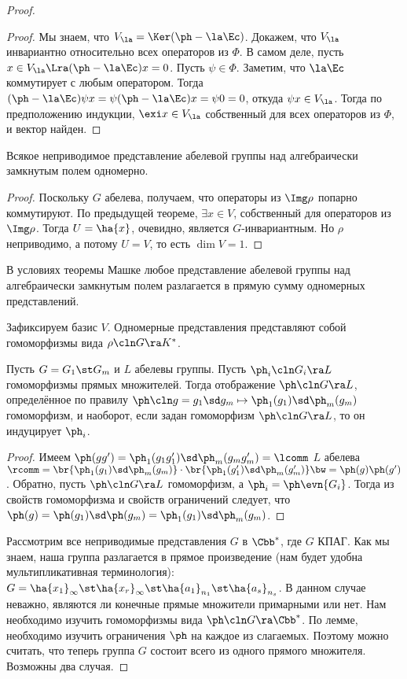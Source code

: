 \documentclass[a4paper]{article}
\begin{document}
\begin{proof}
\begin{proof}
Мы знаем, что $V_\la = \Ker(\ph - \la \Ec)$. Докажем, что $V_\la$ инвариантно  относительно всех операторов
из $\Phi$. В самом деле, пусть $x \in V_\la \Lra (\ph - \la \Ec)x = 0$. Пусть $\psi \in \Phi$. Заметим, что
$\la \Ec$ коммутирует с любым оператором. Тогда $(\ph - \la \Ec)\psi x = \psi (\ph - \la \Ec) x = \psi 0 =
0$, откуда $\psi x \in V_\la$. Тогда по предположению индукции, $\exi x \in V_\la$ собственный для всех
операторов из $\Phi$, и вектор найден.
\end{proof}

\begin{theorem}
Всякое неприводимое представление абелевой группы над алгебраически замкнутым полем одномерно.
\end{theorem}
\begin{proof}
Поскольку $G$ абелева, получаем, что операторы из $\Img \rho$ попарно  коммутируют. По предыдущей теореме,
$\exi x \in V$, собственный для операторов из $\Img \rho$. Тогда $U = \ha{x}$, очевидно, является
$G$-инвариантным. Но $\rho$ неприводимо, а потому $U = V$, то есть $\dim V = 1$.
\end{proof}

\begin{imp}
В условиях теоремы Машке любое представление абелевой группы над алгебраически  замкнутым полем разлагается в
прямую сумму одномерных представлений.
\end{imp}

Зафиксируем базис $V$. Одномерные представления представляют собой  гомоморфизмы вида
$\rho\cln G \ra K^*$.

\begin{lemma}
Пусть $G=G_1\st G_m$ и $L$ абелевы группы. Пусть $\ph_i\cln G_i \ra L$  гомоморфизмы прямых множителей.
Тогда отображение $\ph\cln G \ra L$, определённое по правилу $\ph\cln g = g_1\sd g_m \mapsto \ph_1(g_1)\sd
\ph_m(g_m)$ гомоморфизм, и наоборот, если задан гомоморфизм $\ph\cln G \ra L$, то он индуцирует $\ph_i$.
\end{lemma}
\begin{proof}
Имеем $\ph(gg')=\ph_1(g_1g_1')\sd \ph_m(g_mg_m')= \lcomm$ $L$ абелева  $\rcomm = \br{\ph_1(g_1)\sd
\ph_m(g_m)}\cdot \br{\ph_1(g_1')\sd \ph_m(g_m')}\bw=\ph(g)\ph(g')$.
Обратно, пусть $\ph\cln G \ra L$ гомоморфизм, а $\ph_i = \ph\evn{G_i}$.  Тогда из свойств гомоморфизма и
свойств ограничений следует, что $\ph(g)=\ph(g_1)\sd \ph(g_m)=\ph_1(g_1)\sd \ph_m(g_m)$.
\end{proof}

Рассмотрим  все неприводимые представления $G$ в $\Cbb^*$, где $G$ КПАГ. Как мы знаем, наша группа
разлагается в прямое произведение (нам будет удобна  мультипликативная терминология): $G = \ha{x_1}_\infty\st
\ha{x_r}_\infty\st\ha{a_1}_{n_1}\st \ha{a_s}_{n_s}$. В данном случае неважно, являются ли конечные прямые
множители примарными или нет. Нам необходимо изучить гомоморфизмы вида $\ph\cln G \ra \Cbb^*$. По лемме,
необходимо изучить ограничения $\ph$ на каждое из слагаемых. Поэтому можно считать, что теперь группа $G$
состоит всего из одного прямого множителя. Возможны два случая.


\end{proof}
\end{document}
